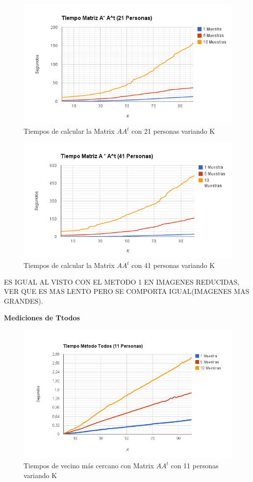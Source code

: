\begin{figure}[H]
\includegraphics[width=1\textwidth]{img/imagef2.png}
     \caption{Tiempos de calcular la Matrix $AA^t$ con 21 personas variando K}
\end{figure}

\begin{figure}[H]
\includegraphics[width=1\textwidth]{img/imagef3.png}
     \caption{Tiempos de calcular la Matrix $AA^t$ con 41 personas variando K}
\end{figure}

ES IGUAL AL VISTO CON EL METODO 1 EN IMAGENES REDUCIDAS, VER QUE ES MAS LENTO PERO SE COMPORTA IGUAL(IMAGENES MAS GRANDES).

\textbf{Mediciones de Ttodos }

\begin{figure}[H]
\includegraphics[width=1\textwidth]{img/imagef4.png}
     \caption{Tiempos de vecino más cercano con Matrix $AA^t$ con 11 personas variando K}
\end{figure}

